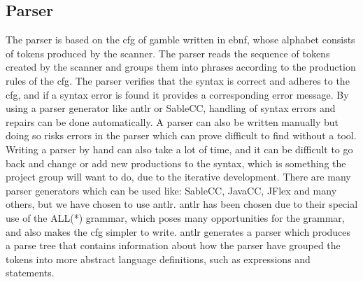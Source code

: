 \subsection*{Parser}\label{subsec:parser}
The parser is based on the \acrfull{cfg} of \gls{gamble} written in \acrfull{ebnf}, whose alphabet consists of tokens produced by the scanner.
The parser reads the sequence of tokens created by the scanner and groups them into phrases according to the production rules of the \acrshort{cfg}.
The parser verifies that the syntax is correct and adheres to the \acrshort{cfg}, and if a syntax error is found it provides a corresponding error message. \citep{Crafting_book}
By using a parser generator like \acrshort{antlr} or SableCC, handling of syntax errors and repairs can be done automatically.
A parser can also be written manually but doing so risks errors in the parser which can prove difficult to find without a tool.
Writing a parser by hand can also take a lot of time, and it can be difficult to go back and change or add new productions to the syntax, which is something the project group will want to do, due to the iterative development.
There are many parser generators which can be used like: SableCC, JavaCC, JFlex and many others, but we have chosen to use \acrshort{antlr}.
\acrshort{antlr} has been chosen due to their special use of the ALL(*) grammar, which poses many opportunities for the grammar, and also makes the \acrshort{cfg} simpler to write.
\acrshort{antlr} generates a parser which produces a parse tree that contains information about how the parser have grouped the tokens into more abstract language definitions, such as expressions and statements.

